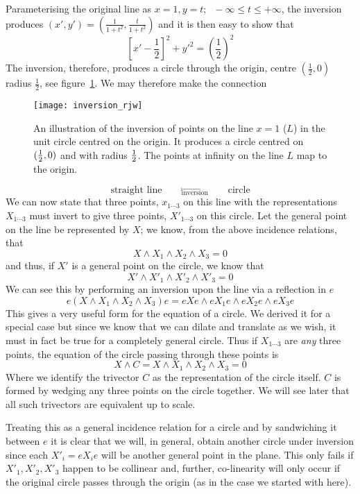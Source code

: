 Parameterising the original line as $x=1, y=t;
\;\;-\infty \le t \le +\infty$, the inversion produces
$(x',y') = \left(\frac{1}{1+ t^2},\frac{t}{1+t^2}\right)$
and it is then easy to show that
%
\[ \left[x'-\frac{1}{2}\right]^2 + y'^2 = \left(\frac{1}{2}\right)^2  \]
%
The inversion, therefore, produces a circle through the origin,
centre $(\frac{1}{2},0)$ radius $\frac{1}{2}$, see
figure~\ref{figlinecircle}. We may therefore make the connection
%
\begin{figure}
\centerline{
\texttt{[image: inversion\_rjw]}
} \caption{An illustration of the inversion of points on the
line $x=1$ ($L$) in the unit circle centred on the origin. It produces
a circle centred on $(\frac{1}{2},0)$ and with radius $\frac{1}{2}$. The points at 
infinity on the line $L$ map to the origin.} \label{figlinecircle}
\end{figure}
%
\[  \mbox{straight line}\qquad \stackrel{\longmapsto}{_{\mbox{inversion}}} \qquad \mbox{circle}  \]
%
We can now state that three points, $x_{1\cdots3}$ on this line
with the representations $X_{1\cdots3}$ must invert to give three
points, $X'_{1\cdots3}$ on this circle. Let the general
point on the line be represented by $X$; we know, from the above
incidence relations, that
%
\[  X\wedge X_1 \wedge X_2 \wedge X_3  = 0  \]
%
and thus, if $X'$ is a general point on the circle, we know
that
%
 \[  X'\wedge X'_1 \wedge X'_2 \wedge X'_3  = 0  \]
%
We can see this by performing an inversion upon the line via a reflection 
in $e$
%
 \[e(X\wedge X_1 \wedge X_2 \wedge X_3)e = eXe\wedge eX_1e \wedge eX_2e \wedge eX_3e\]
%
This gives a very useful form for the equation of a circle.  We derived
it for a special case but since we know that we can dilate and translate as we
wish, it must in fact be true for a completely general  circle.  Thus if
$X_{1\cdots3}$  are \emph{any} three points, the equation of the circle
passing through these points is
%
\begin{equation}
    X \wedge C = X \wedge X_1 \wedge X_2 \wedge X_3 = 0
    \end{equation}
%
Where we identify the trivector $C$ as the representation of the circle itself.
$C$ is formed by wedging any three points on the circle together. We will see
later that all such trivectors are equivalent up to scale.

Treating this as a general incidence relation for a circle and by sandwiching
it between $e$ it is clear that we will, in general, obtain
another circle under inversion since each $X'_i = eX_i e$ will be another
general point in the plane.  This only fails if $X'_1,X'_2,X'_3$ happen to be
collinear and, further, co-linearity will only occur if the original circle
passes through the origin (as in the case we started with here).

